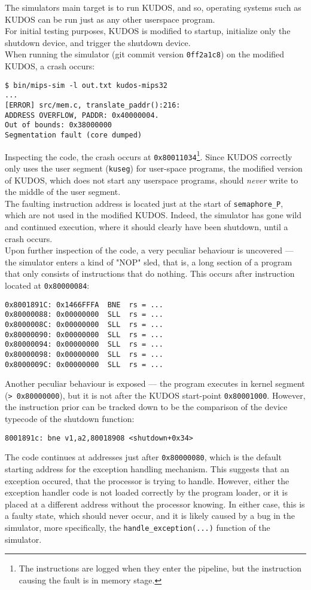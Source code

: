 The simulators main target is to run KUDOS, and so, operating systems such as KUDOS
can be run just as any other userspace program.\\
For initial testing purposes, KUDOS is modified to startup, initialize only
the shutdown device, and trigger the shutdown device.\\
When running the simulator (git commit version \texttt{0ff2a1c8}) on the modified
KUDOS, a crash occurs:
\begin{verbatim}
$ bin/mips-sim -l out.txt kudos-mips32
...
[ERROR] src/mem.c, translate_paddr():216:
ADDRESS OVERFLOW, PADDR: 0x40000004.
Out of bounds: 0x38000000
Segmentation fault (core dumped)
\end{verbatim}
Inspecting the code, the crash occurs at \texttt{0x80011034}\footnote{The instructions
are logged when they enter the pipeline, but the instruction causing the fault is
in memory stage.}. Since KUDOS correctly only uses the user segment (\texttt{kuseg})
for user-space programs, the modified version of KUDOS, which does not start
any userspace programs, should \textit{never} write to the middle of the user segment.\\
The faulting instruction address is located just at the start of \texttt{semaphore\_P},
which are not used in the modified KUDOS. Indeed, the simulator has gone wild and
continued execution, where it should clearly have been shutdown, until a crash
occurs.\\
Upon further inspection of the code, a very peculiar behaviour is uncovered ---
the simulator enters a kind of "NOP" sled, that is, a long section of a program
that only consists of instructions that do nothing. This occurs after instruction
located at \texttt{0x80000084}:
\begin{verbatim}
0x8001891C: 0x1466FFFA  BNE  rs = ...
0x80000088: 0x00000000  SLL  rs = ...
0x8000008C: 0x00000000  SLL  rs = ...
0x80000090: 0x00000000  SLL  rs = ...
0x80000094: 0x00000000  SLL  rs = ...
0x80000098: 0x00000000  SLL  rs = ...
0x8000009C: 0x00000000  SLL  rs = ...
\end{verbatim}
Another peculiar behaviour is exposed --- the program executes in kernel segment
(\texttt{> 0x80000000}), but it is not after the KUDOS start-point \texttt{0x80001000}.
However, the instruction prior can be tracked down to be the comparison of the
device typecode of the shutdown function:
\begin{verbatim}
8001891c: bne v1,a2,80018908 <shutdown+0x34>
\end{verbatim}
The code continues at addresses just after \texttt{0x80000080}, which is the
default starting address for the exception handling mechanism. This suggests
that an exception occured, that the processor is trying to handle. However, either
the exception handler code is not loaded correctly by the program loader, or it
is placed at a different address without the processor knowing. In either case,
this is a faulty state, which should never occur, and it is likely caused by a
bug in the simulator, more specifically, the \texttt{handle\_exception(...)}
function of the simulator.
